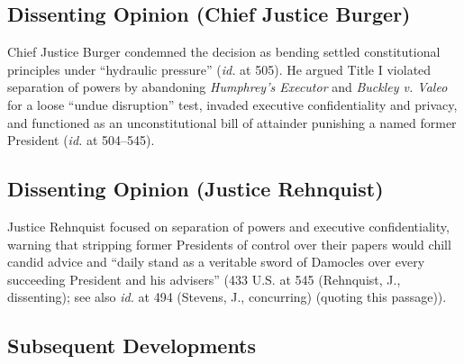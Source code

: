 \documentclass[12pt]{article}
\begin{document}
\subsection{Dissenting Opinion (Chief Justice Burger)}

Chief Justice Burger condemned the decision as bending settled constitutional principles under ``hydraulic pressure'' (\textit{id.} at 505). He argued Title I violated separation of powers by abandoning \textit{Humphrey's Executor} and \textit{Buckley v. Valeo} for a loose ``undue disruption'' test, invaded executive confidentiality and privacy, and functioned as an unconstitutional bill of attainder punishing a named former President (\textit{id.} at 504--545).

\subsection{Dissenting Opinion (Justice Rehnquist)}

Justice Rehnquist focused on separation of powers and executive confidentiality, warning that stripping former Presidents of control over their papers would chill candid advice and ``daily stand as a veritable sword of Damocles over every succeeding President and his advisers'' (433 U.S. at 545 (Rehnquist, J., dissenting); see also \textit{id.} at 494 (Stevens, J., concurring) (quoting this passage)).

\subsection{Subsequent Developments}
\end{document}
